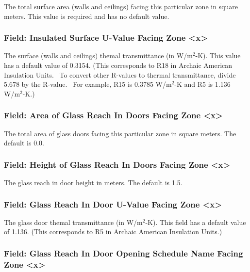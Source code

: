 The total surface area (walls and ceilings) facing this particular zone in square meters. This value is required and has no default value.

\subsubsection{Field: Insulated Surface U-Value Facing Zone \textless{}x\textgreater{}}\label{field-insulated-surface-u-value-facing-zone-x}

The surface (walls and ceilings) themal transmittance (in W/m\(^{2}\)-K). This value has a default value of 0.3154. (This corresponds to R18 in Archaic American Insulation Units.~ To convert other R-values to thermal transmittance, divide 5.678 by the R-value.~ For example, R15 is 0.3785 W/m\(^{2}\)-K and R5 is 1.136 W/m\(^{2}\)-K.)

\subsubsection{Field: Area of Glass Reach In Doors Facing Zone \textless{}x\textgreater{}}\label{field-area-of-glass-reach-in-doors-facing-zone-x}

The total area of glass doors facing this particular zone in square meters. The default is 0.0.

\subsubsection{Field: Height of Glass Reach In Doors Facing Zone \textless{}x\textgreater{}}\label{field-height-of-glass-reach-in-doors-facing-zone-x}

The glass reach in door height in meters. The default is 1.5.

\subsubsection{Field: Glass Reach In Door U-Value Facing Zone \textless{}x\textgreater{}}\label{field-glass-reach-in-door-u-value-facing-zone-x}

The glass door themal transmittance (in W/m\(^{2}\)-K). This field has a default value of 1.136. (This corresponds to R5 in Archaic American Insulation Units.)

\subsubsection{Field: Glass Reach In Door Opening Schedule Name Facing Zone \textless{}x\textgreater{}}\label{field-glass-reach-in-door-opening-schedule-name-facing-zone-x}

